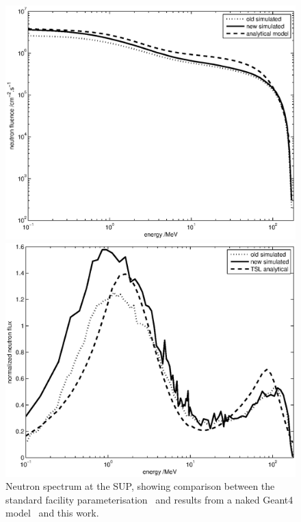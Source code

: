 \documentclass[11pt,a4paper]{IEEEtran}
\let\MYoriglatexcaption\caption
\renewcommand{\caption}[2][\relax]{\MYoriglatexcaption[#2]{#2}}
\begin{document}
\begin{figure}[t]
    \begin{minipage}{\columnwidth}
        \includegraphics[width=\columnwidth]{SUPComparedIFluxRADECS.eps}
    \end{minipage}
    \begin{minipage}{\columnwidth}
        \includegraphics[width=\columnwidth]{SUPNormalisedRADECS.eps}
    \end{minipage}
	\caption{
        Neutron spectrum at the SUP, showing comparison between the standard facility parameterisation~\cite{Prokofiev2009} and results from a naked Geant4 model~\cite{Platt13} and this work.
    }
	\label{fig:SUPSpectraComparison}
\end{figure}
\end{document}
